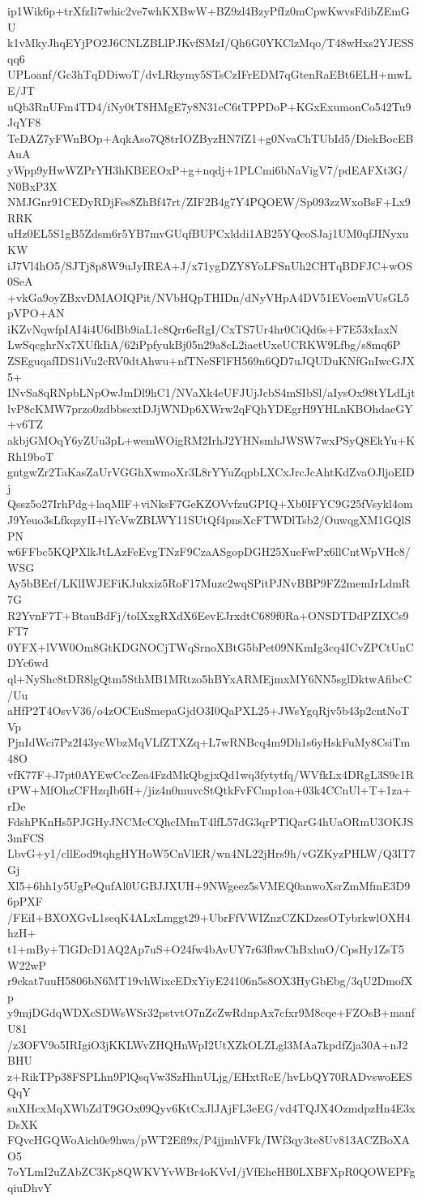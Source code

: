 ip1Wik6p+trXfzIi7whic2ve7whKXBwW+BZ9zl4BzyPfIz0mCpwKwvsFdibZEmGU
k1vMkyJhqEYjPO2J6CNLZBLlPJKvfSMzI/Qh6G0YKClzMqo/T48wHxs2YJESSqq6
UPLoanf/Gc3hTqDDiwoT/dvLRkymy5STsCzIFrEDM7qGtenRaEBt6ELH+mwLE/JT
uQb3RnUFm4TD4/iNy0tT8HMgE7y8N31cC6tTPPDoP+KGxExumonCo542Tu9JqYF8
TeDAZ7yFWnBOp+AqkAso7Q8trIOZByzHN7fZ1+g0NvaChTUbId5/DiekBocEBAuA
yWpp9yHwWZPrYH3hKBEEOxP+g+nqdj+1PLCmi6bNaVigV7/pdEAFXt3G/N0BxP3X
NMJGnr91CEDyRDjFes8ZhBf47rt/ZIF2B4g7Y4PQOEW/Sp093zzWxoBsF+Lx9RRK
uHz0EL5S1gB5Zdsm6r5YB7mvGUqfBUPCxlddi1AB25YQeoSJaj1UM0qfJINyxuKW
iJ7Vl4hO5/SJTj8p8W9uJyIREA+J/x71ygDZY8YoLFSnUh2CHTqBDFJC+wOS0SeA
+vkGa9oyZBxvDMAOIQPit/NVbHQpTHIDn/dNyVHpA4DV51EVoemVUsGL5pVPO+AN
iKZvNqwfpIAI4i4U6dBb9iaL1c8Qrr6eRgI/CxTS7Ur4hr0CiQd6s+F7E53xIaxN
LwSqcghrNx7XUfkIiA/62iPpfyukBj05n29a8cL2iaetUxeUCRKW9Lfbg/s8mq6P
ZSEguqafIDS1iVu2cRV0dtAhwu+nfTNeSFlFH569n6QD7uJQUDuKNfGnIwcGJX5+
INvSa8qRNpbLNpOwJmDl9hC1/NVaXk4eUFJUjJcbS4mSIbSl/aIysOx98tYLdLjt
lvP8cKMW7przo0zdbbscxtDJjWNDp6XWrw2qFQhYDEgrH9YHLnKBOhdaeGY+v6TZ
akbjGMOqY6yZUu3pL+wemWOigRM2IrhJ2YHNsmhJWSW7wxPSyQ8EkYu+KRh19boT
gntgwZr2TaKasZaUrVGGhXwmoXr3L8rYYuZqpbLXCxJrcJcAhtKdZvaOJljoEIDj
Qssz5o27IrhPdg+laqMlF+viNksF7GeKZOVvfzuGPIQ+Xb0IFYC9G25fVsykl4om
J9Yeuo3sLfkqzyII+lYcVwZBLWY11SUtQf4pnsXcFTWDlTsb2/OuwqgXM1GQlSPN
w6FFbc5KQPXlkJtLAzFeEvgTNzF9CzaASgopDGH25XueFwPx6llCntWpVHc8/WSG
Ay5bBErf/LKlIWJEFiKJukxiz5RoF17Muzc2wqSPitPJNvBBP9FZ2memIrLdmR7G
R2YvnF7T+BtauBdFj/tolXxgRXdX6EevEJrxdtC689f0Ra+ONSDTDdPZIXCs9FT7
0YFX+lVW0Om8GtKDGNOCjTWqSrnoXBtG5bPet09NKmIg3cq4ICvZPCtUnCDYc6wd
ql+NyShc8tDR8lgQtm5SthMB1MRtzo5hBYxARMEjmxMY6NN5sglDktwAfibcC/Uu
aHfP2T4OsvV36/o4zOCEuSmepaGjdO3I0QaPXL25+JWsYgqRjv5b43p2cntNoTVp
PjnIdWci7Pz2I43ycWbzMqVLfZTXZq+L7wRNBcq4m9Dh1s6yHskFuMy8CsiTm48O
vfK77F+J7pt0AYEwCccZea4FzdMkQbgjxQd1wq3fytytfq/WVfkLx4DRgL3S9c1R
tPW+MfOhzCFHzqIb6H+/jiz4n0muvcStQtkFvFCmp1oa+03k4CCnUl+T+1za+rDe
FdshPKnHs5PJGHyJNCMcCQhcIMmT4lfL57dG3qrPTlQarG4hUaORmU3OKJS3mFCS
LbvG+y1/cllEod9tqhgHYHoW5CnVlER/wn4NL22jHrs9h/vGZKyzPHLW/Q3IT7Gj
Xl5+6hh1y5UgPeQufAl0UGBJJXUH+9NWgeez5sVMEQ0anwoXsrZmMfmE3D96pPXF
/FEiI+BXOXGvL1seqK4ALxLmggt29+UbrFfVWIZnzCZKDzesOTybrkwlOXH4hzH+
t1+mBy+TlGDcD1AQ2Ap7uS+O24fw4bAvUY7r63fbwChBxhuO/CpsHy1ZsT5W22wP
r9ckat7uuH5806bN6MT19vhWixcEDxYiyE24106n5s8OX3HyGbEbg/3qU2DmofXp
y9mjDGdqWDXcSDWsWSr32pstvtO7nZcZwRdnpAx7cfxr9M8cqe+FZOsB+manfU81
/z3OFV9o5IRIgiO3jKKLWvZHQHnWpI2UtXZkOLZLgl3MAa7kpdfZja30A+nJ2BHU
z+RikTPp38FSPLhn9PlQsqVw3SzHhnULjg/EHxtRcE/hvLbQY70RADvswoEESQqY
suXHcxMqXWbZdT9GOx09Qyv6KtCxJlJAjFL3eEG/vd4TQJX4OzmdpzHn4E3xDsXK
FQvcHGQWoAich0e9hwa/pWT2Efl9x/P4jjmhVFk/IWf3qy3te8Uv813ACZBoXAO5
7oYLmI2uZAbZC3Kp8QWKVYvWBr4oKVvI/jVfEheHB0LXBFXpR0QOWEPFgqiuDhvY
